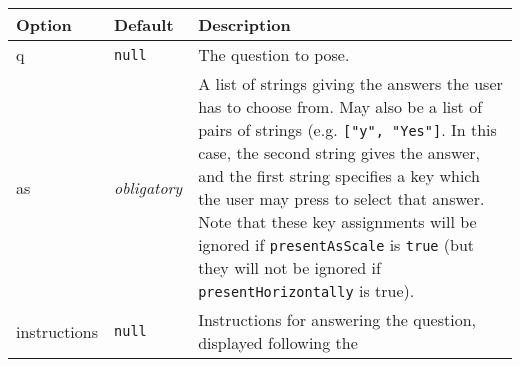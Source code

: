 \documentclass[
]{article}
\begin{document}
\begin{RaggedRight}\small\begin{longtable}[]{p{1.7in}p{1in}p{3.15in}}
\toprule
\begin{minipage}[b]{0.16\columnwidth}\raggedright
\textbf{Option}\strut
\end{minipage} & \begin{minipage}[b]{0.14\columnwidth}\raggedright
\textbf{Default}\strut
\end{minipage} & \begin{minipage}[b]{0.61\columnwidth}\raggedright
\textbf{Description}\strut
\end{minipage}\tabularnewline
\midrule
\endhead
\begin{minipage}[t]{0.16\columnwidth}\raggedright
q\strut
\end{minipage} & \begin{minipage}[t]{0.14\columnwidth}\raggedright
\texttt{null}\strut
\end{minipage} & \begin{minipage}[t]{0.61\columnwidth}\raggedright
The question to pose.\strut
\end{minipage}\tabularnewline
\begin{minipage}[t]{0.16\columnwidth}\raggedright
as\strut
\end{minipage} & \begin{minipage}[t]{0.14\columnwidth}\raggedright
\emph{obligatory}\strut
\end{minipage} & \begin{minipage}[t]{0.61\columnwidth}\raggedright
A list of strings giving the answers the user has to choose from. May
also be a list of pairs of strings (e.g. \texttt{{[}"y",\ "Yes"{]}}. In
this case, the second string gives the answer, and the first string
specifies a key which the user may press to select that answer. Note
that these key assignments will be ignored if \texttt{presentAsScale} is
\texttt{true} (but they will not be ignored if
\texttt{presentHorizontally} is true).\strut
\end{minipage}\tabularnewline
\begin{minipage}[t]{0.16\columnwidth}\raggedright
instructions\strut
\end{minipage} & \begin{minipage}[t]{0.14\columnwidth}\raggedright
\texttt{null}\strut
\end{minipage} & \begin{minipage}[t]{0.61\columnwidth}\raggedright
Instructions for answering the question, displayed following the

\end{minipage}
\end{longtable}
\end{RaggedRight}
\end{document}
